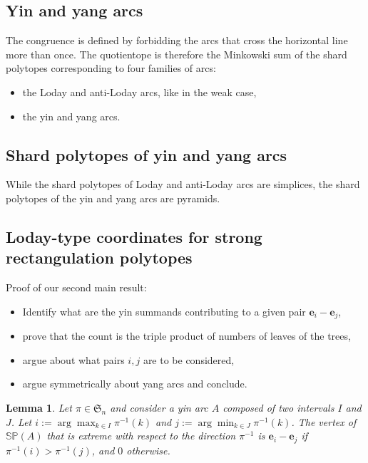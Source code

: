 \documentclass{amsart}
\newtheorem{lemma}[theorem]{Lemma}
\theoremstyle{definition}
\newcommand{\f}[1]{\mathfrak{#1}} %
\newcommand{\polytope}[1]{\mathds{#1}} %
\newcommand{\SP}{\polytope{SP}}
\begin{document}
\subsection{Yin and yang arcs}

The congruence is defined by forbidding the arcs that cross the horizontal line more than once.
The quotientope is therefore the Minkowski sum of the shard polytopes corresponding to four families of arcs:
\begin{itemize}
\item the Loday and anti-Loday arcs, like in the weak case,
\item the yin and yang arcs.
\end{itemize}

\subsection{Shard polytopes of yin and yang arcs}

While the shard polytopes of Loday and anti-Loday arcs are simplices, the shard polytopes of the yin and yang arcs are pyramids. 

\subsection{Loday-type coordinates for strong rectangulation polytopes}

Proof of our second main result:
\begin{itemize}
\item Identify what are the yin summands contributing to a given pair $\mathbf{e}_i - \mathbf{e}_j$,
\item prove that the count is the triple product of numbers of leaves of the trees,
\item argue about what pairs $i,j$ are to be considered,
\item argue symmetrically about yang arcs and conclude.
\end{itemize}

\begin{lemma}
  \label{lem:yinminmax}
  Let $\pi\in\f{S}_n$ and consider a yin arc $A$ composed of two intervals $I$ and $J$.
  Let $i := \arg\max_{k\in I} \pi^{-1}(k)$ and $j := \arg\min_{k\in J} \pi^{-1}(k)$.
  The vertex of $\SP(A)$ that is extreme with respect to the direction $\pi^{-1}$
  is $\mathbf{e}_i-\mathbf{e}_j$ if $\pi^{-1}(i)>\pi^{-1}(j)$, and $0$ otherwise.
\end{lemma}
\end{document}
